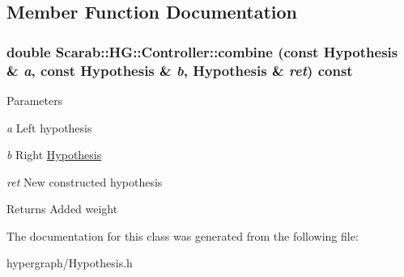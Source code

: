 \subsection{Member Function Documentation}
\hypertarget{class_scarab_1_1_h_g_1_1_controller_a34cfe4b8e7496ffca1cedf64cb3f0a73}{
\subsubsection[{combine}]{\setlength{\rightskip}{0pt plus 5cm}double Scarab::HG::Controller::combine (const {\bf Hypothesis} \& {\em a}, \/  const {\bf Hypothesis} \& {\em b}, \/  {\bf Hypothesis} \& {\em ret}) const}}
\label{class_scarab_1_1_h_g_1_1_controller_a34cfe4b8e7496ffca1cedf64cb3f0a73}

\begin{DoxyParams}{Parameters}
\item[{\em a}]Left hypothesis \item[{\em b}]Right \hyperlink{struct_scarab_1_1_h_g_1_1_hypothesis}{Hypothesis} \item[{\em ret}]New constructed hypothesis\end{DoxyParams}
\begin{DoxyReturn}{Returns}
Added weight 
\end{DoxyReturn}


The documentation for this class was generated from the following file:\begin{DoxyCompactItemize}
\item 
hypergraph/Hypothesis.h\end{DoxyCompactItemize}
